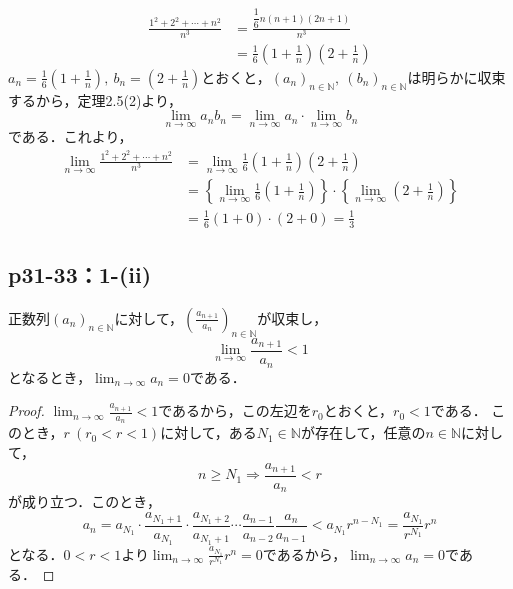 \documentclass[a4paper,10pt,fleqn]{ltjsarticle}
\begin{document}
\begin{tleftbar}
	\begin{align*}
		\frac{1^2+2^2+\cdots+n^2}{n^3} & = \frac{\dfrac{1}{6}n(n+1)(2n+1)}{n^3} \\
		& =\frac{1}{6} \left(1+\frac{1}{n} \right ) \left(2+\frac{1}{n} \right)
	\end{align*}
	$a_n = \frac{1}{6} \left(1+\frac{1}{n} \right ),~b_n = \left(2+\frac{1}{n} \right)$とおくと，$(a_n)_{n \in \mathbb{N}},~(b_n)_{n \in \mathbb{N}}$は明らかに収束するから，定理2.5(2)より，
	\[
		\lim_{n \to \infty} a_n b_n = \lim_{n \to \infty} a_n \cdot  \lim_{n \to \infty} b_n 
	\]
	である．これより，
	\begin{align*}
		\lim_{n \to \infty} \frac{1^2+2^2+\cdots+n^2}{n^3} & = \lim_{n \to \infty} \frac{1}{6} \left(1+\frac{1}{n} \right ) \left(2+\frac{1}{n} \right) \\
		& = \left \{\lim_{n \to \infty} \frac{1}{6} \left(1+\frac{1}{n} \right ) \right \} \cdot \left \{\lim_{n \to \infty} \left(2+\frac{1}{n} \right ) \right \} \\
		& = \frac{1}{6} (1+0) \cdot (2+0) =\frac{1}{3}
	\end{align*}
\end{tleftbar}


\subsection*{p31-33：1-(ii)}



    正数列$(a_n)_{n \in \mathbb{N}}$に対して，$\left(\frac{a_{n+1}}{a_n} \right)_{n \in \mathbb{N}}$が収束し，
    \[
    \lim_{n \to \infty} \frac{a_{n+1}}{a_n} <1
    \]
    となるとき，$\lim_{n \to \infty} a_n =0$である．

\begin{proof}
   $ \lim_{n \to \infty} \frac{a_{n+1}}{a_n} <1$であるから，この左辺を$r_0$とおくと，$r_0<1$である．
   このとき，$r~(r_0<r<1)$に対して，ある$N_1 \in \mathbb{N}$が存在して，任意の$n \in \mathbb{N}$に対して，
   \[
       n \ge N_1 \Longrightarrow \frac{a_{n+1}}{a_n}<r
   \]
   が成り立つ．このとき，
   \[
       a_n = a_{N_1} \cdot \frac{a_{N_1+1}}{a_{N_1}} \cdot \frac{a_{N_1 +2}}{a_{N_1 +1}} \dotsm \frac{a_{n-1}}{a_{n-2}} \frac{a_n}{a_{n-1}}< a_{N_1} r^{n-N_1}=\frac{a_{N_1}}{r^{N_1}} r^n
   \]
   となる．$0<r<1$より$\lim_{n \to \infty} \frac{a_{N_1}}{r^{N_1}} r^n =0$であるから，$\lim_{n \to \infty} a_n =0$である．
\end{proof}
\end{document}
